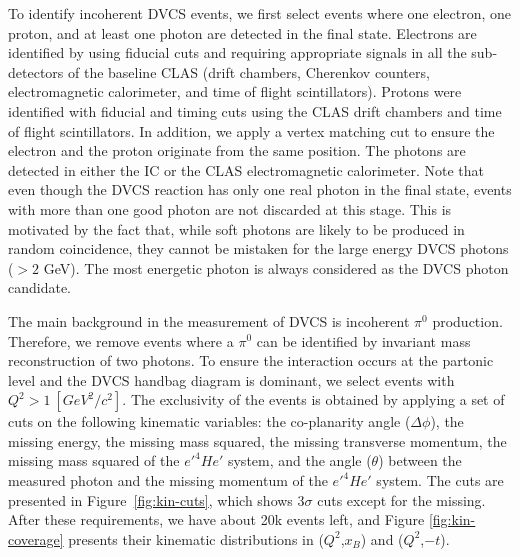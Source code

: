 \documentclass[twocolumn,nofootinbib,showpacs,prl,superscriptaddress,secnumarabic,amssymb,nobibnotes,aps,floatfix]{revtex4}
\begin{document}
To identify incoherent DVCS events, we first select events where one electron, 
one proton, and at least one photon are detected in the final state. Electrons 
are identified by using fiducial cuts and requiring appropriate signals in all 
the sub-detectors of the baseline CLAS (drift chambers, Cherenkov counters, 
electromagnetic calorimeter, and time of flight scintillators). Protons were 
identified with fiducial and timing cuts using the CLAS drift chambers and time 
of flight scintillators. In addition, we apply a vertex matching cut to ensure 
the electron and the proton originate from the same position. The photons are 
detected in either the IC or the CLAS electromagnetic calorimeter.  Note that 
even though the DVCS reaction has only one real photon in the final state, 
events with more than one good photon are not discarded at this stage. This is 
motivated by the fact that, while soft photons are likely to be produced in 
random coincidence, they cannot be mistaken for the large energy DVCS photons 
($>2$ GeV). The most energetic photon is always considered as the DVCS photon 
candidate.

The main background in the measurement of DVCS is incoherent $\pi^{0}$ 
production. Therefore, we remove events where a $\pi^{0}$ can be identified by 
invariant mass reconstruction of two photons. To ensure the interaction occurs 
at the partonic level and the DVCS handbag diagram is dominant, we select 
events with $Q^{2}>1~[GeV^{2}/c^{2}]$. The exclusivity of the events is 
obtained by applying a set of cuts on the following kinematic variables: the 
co-planarity angle ($\Delta \phi$), the missing energy, the missing mass 
squared, the missing transverse momentum, the missing mass squared of the 
$e'^4He'$ system, and the angle ($\theta$) between the measured photon and the 
missing momentum of the $e'^4He'$ system. The cuts are presented in 
Figure~\ref{fig:kin-cuts}, which shows 3$\sigma$ cuts except for the missing.  
After these requirements, we have about 20k events left, and Figure 
\ref{fig:kin-coverage} presents their
kinematic distributions in ($Q^{2}$,$x_{B}$) and ($Q^{2}$,$-t$).
\end{document}
